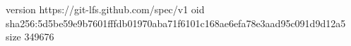 version https://git-lfs.github.com/spec/v1
oid sha256:5d5be59e9b7601fffdb01970aba71f6101c168ae6efa78e3aad95c091d9d12a5
size 349676
